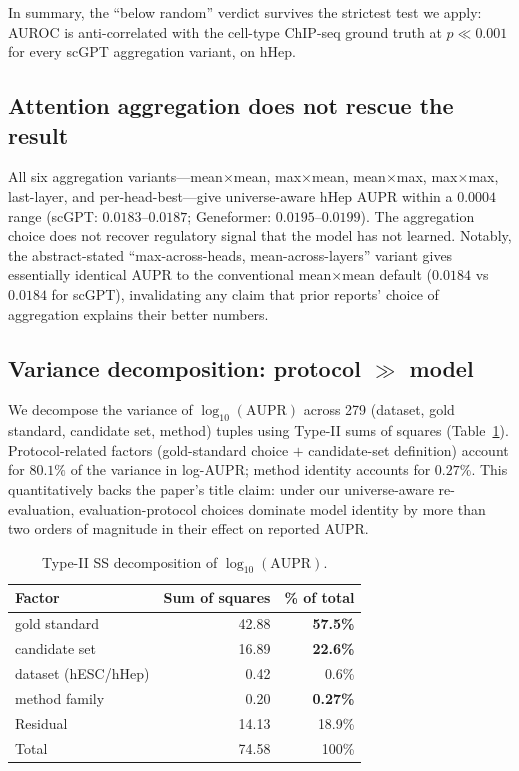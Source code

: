 \documentclass[sigconf]{acmart}
\begin{document}
In summary, the ``below random'' verdict survives the strictest test
we apply: AUROC is anti-correlated with the cell-type ChIP-seq ground
truth at $p \ll 0.001$ for every scGPT aggregation variant, on hHep.

\subsection{Attention aggregation does not rescue the result}
\label{sec:agg_ablation}

All six aggregation variants---mean$\times$mean, max$\times$mean,
mean$\times$max, max$\times$max, last-layer, and per-head-best---give
universe-aware hHep AUPR within a $0.0004$ range
(scGPT: $0.0183$--$0.0187$;
Geneformer: $0.0195$--$0.0199$). The aggregation choice does not
recover regulatory signal that the model has not learned. Notably,
the abstract-stated ``max-across-heads, mean-across-layers'' variant
gives essentially identical AUPR to the conventional mean$\times$mean
default ($0.0184$ vs $0.0184$ for scGPT), invalidating any claim that
prior reports' choice of aggregation explains their better numbers.

\subsection{Variance decomposition: protocol $\gg$ model}
\label{sec:variance_decomp}

We decompose the variance of $\log_{10}(\text{AUPR})$ across 279
(dataset, gold standard, candidate set, method) tuples using Type-II
sums of squares (Table~\ref{tab:anova}). Protocol-related factors
(gold-standard choice $+$ candidate-set definition) account for
$\mathbf{80.1\%}$ of the variance in log-AUPR; method identity accounts
for $\mathbf{0.27\%}$. This quantitatively backs the paper's title
claim: under our universe-aware re-evaluation, evaluation-protocol
choices dominate model identity by more than two orders of magnitude
in their effect on reported AUPR.

\begin{table}[t]
\caption{Type-II SS decomposition of $\log_{10}(\text{AUPR})$.}
\label{tab:anova}
\small
\begin{tabular}{lrr}
\toprule
Factor & Sum of squares & \% of total \\
\midrule
gold standard         & 42.88 & \textbf{57.5\%} \\
candidate set         & 16.89 & \textbf{22.6\%} \\
dataset (hESC/hHep)   & 0.42  & 0.6\% \\
method family         & 0.20  & \textbf{0.27\%} \\
Residual              & 14.13 & 18.9\% \\
\midrule
Total                 & 74.58 & 100\% \\
\bottomrule
\end{tabular}
\end{table}
\end{document}

